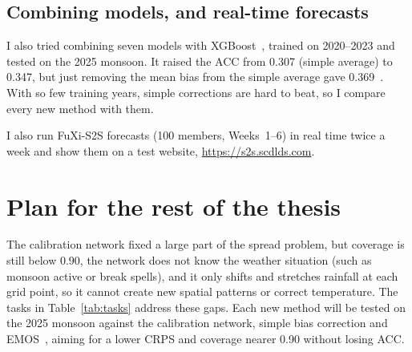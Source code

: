 \documentclass[11pt,a4paper]{article}
\begin{document}
\subsection{Combining models, and real-time forecasts}
I also tried combining seven models with XGBoost~\cite{kimani2025piggycast,chen2016xgboost}, trained on 2020--2023 and tested on the
2025 monsoon. It raised the ACC from 0.307 (simple average) to 0.347, but just removing the mean bias from the simple average gave
0.369~\cite{raj2026piggy}. With so few training years, simple corrections are hard to beat, so I compare every new method with them.

I also run FuXi-S2S forecasts (100 members, Weeks~1--6) in real time twice a week and show them on a test website,
\url{https://s2s.scdlds.com}.

\FloatBarrier
\section{Plan for the rest of the thesis}
The calibration network fixed a large part of the spread problem, but coverage is still below 0.90, the network does not know the
weather situation (such as monsoon active or break spells), and it only shifts and stretches rainfall at each grid
point, so it cannot create new spatial patterns or correct temperature. The tasks in Table~\ref{tab:tasks} address these gaps. Each new method will be tested on the 2025 monsoon against the
calibration network, simple bias correction and EMOS~\cite{gneiting2005emos}, aiming for a lower CRPS and coverage nearer 0.90 without
losing ACC.
\end{document}
